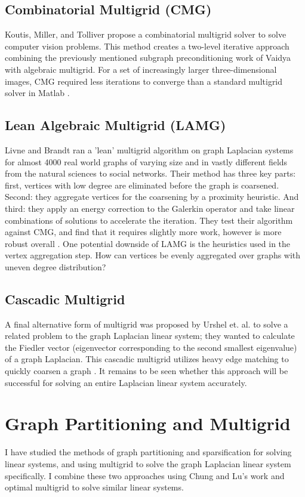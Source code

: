 \subsection{Combinatorial Multigrid (CMG)}
Koutis, Miller, and Tolliver propose a combinatorial multigrid solver to solve computer vision problems. This method creates a two-level iterative approach combining the previously mentioned subgraph preconditioning work of Vaidya with algebraic multigrid. For a set of increasingly larger three-dimensional images, CMG required less iterations to converge than a standard multigrid solver in Matlab \cite{Koutis:2011}.

\subsection{Lean Algebraic Multigrid (LAMG)}
Livne and Brandt ran a 'lean' multigrid algorithm on graph Laplacian systems for almost 4000 real world graphs of varying size and in vastly different fields from the natural sciences to social networks. Their method has three key parts: first, vertices with low degree are eliminated before the graph is coarsened. Second: they aggregate vertices for the coarsening by a proximity heuristic. And third: they apply an energy correction to the Galerkin operator and take linear combinations of solutions to
accelerate the iteration. They test their algorithm against CMG, and find that it requires slightly more work, however is more robust overall \cite{Livne:2012}. One potential downside of LAMG is
the heuristics used in the vertex aggregation step. How can vertices be evenly aggregated over graphs with uneven degree distribution?


\subsection{Cascadic Multigrid}
A final alternative form of multigrid was proposed by Urshel et. al. to solve a related problem to the graph Laplacian linear system; they wanted to calculate the Fiedler vector (eigenvector corresponding to the second smallest eigenvalue) of a graph Laplacian. This cascadic multigrid utilizes heavy edge matching to quickly coarsen a graph \cite{Urschel:2014}. It remains to be seen whether this approach will be successful for solving an entire Laplacian linear system accurately.

\section{Graph Partitioning and Multigrid}
I have studied the methods of graph partitioning and sparsification for solving linear systems, and using multigrid to solve the graph Laplacian linear system specifically. I combine these two approaches using Chung and Lu's work \cite{Chung:2004} and optimal multigrid to solve similar linear systems.
%
%


%
